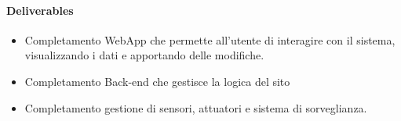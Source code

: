 \paragraph{Deliverables}
\begin{itemize}
\item Completamento WebApp che permette all'utente di interagire con il sistema, visualizzando i dati e apportando delle modifiche. 
    \item Completamento Back-end che gestisce la logica del sito
    \item Completamento gestione di sensori, attuatori e sistema di sorveglianza.
\end{itemize}




